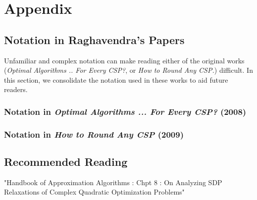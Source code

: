 \section*{Appendix}
\subsection*{Notation in Raghavendra's Papers}
Unfamiliar and complex notation can make reading either of the original works (\textit{Optimal Algorithms .. For Every CSP?}, or \textit{How to Round Any CSP.}) difficult. In this section, we consolidate the notation used in these works to aid future readers.

\subsubsection*{Notation in \textit{Optimal Algorithms ... For Every CSP?} (2008)}

\subsubsection*{Notation in \textit{How to Round Any CSP} (2009)}

\subsection{Recommended Reading}
"Handbook of Approximation Algorithms : Chpt 8 : On Analyzing SDP Relaxations of Complex Quadratic Optimization Problems"